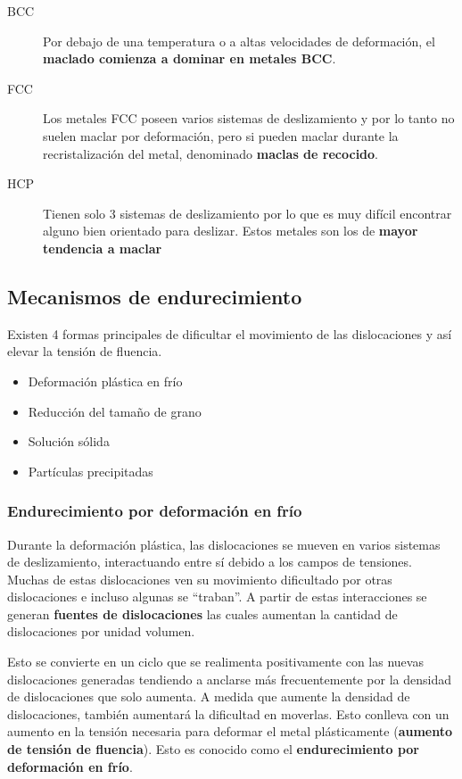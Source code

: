 \begin{description}
	\item[BCC] Por debajo de una temperatura o a altas velocidades de deformación, el \textbf{maclado comienza a dominar en metales BCC}. 
	\item[FCC] Los metales FCC poseen varios sistemas de deslizamiento y por lo tanto no suelen maclar por deformación, pero si pueden maclar durante la recristalización del metal, denominado \textbf{maclas de recocido}.
	\item[HCP] Tienen solo 3 sistemas de deslizamiento por lo que es muy difícil encontrar alguno bien orientado para deslizar. Estos metales son los de \textbf{mayor tendencia a maclar}
\end{description}

\subsection{Mecanismos de endurecimiento}

Existen 4 formas principales de dificultar el movimiento de las dislocaciones y así elevar la tensión de fluencia.

\begin{itemize}
	\item Deformación plástica en frío
	\item Reducción del tamaño de grano
	\item Solución sólida
	\item Partículas precipitadas
\end{itemize}


\subsubsection{Endurecimiento por deformación en frío}

Durante la deformación plástica, las dislocaciones se mueven en varios sistemas de deslizamiento, interactuando entre sí debido a los campos de tensiones. Muchas de estas dislocaciones ven su movimiento dificultado por otras dislocaciones e incluso algunas se ``traban''. A partir de estas interacciones se generan \textbf{fuentes de dislocaciones} las cuales aumentan la cantidad de dislocaciones por unidad volumen. 

Esto se convierte en un ciclo que se realimenta positivamente con las nuevas dislocaciones generadas tendiendo a anclarse más frecuentemente por la densidad de dislocaciones que solo aumenta. A medida que aumente la densidad de dislocaciones, también aumentará la dificultad en moverlas. Esto conlleva con un aumento en la tensión necesaria para deformar el metal plásticamente (\textbf{aumento de tensión de fluencia}). Esto es conocido como el \textbf{endurecimiento por deformación en frío}.

